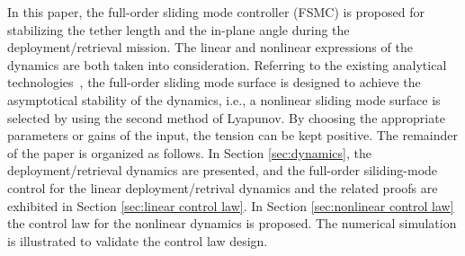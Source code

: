 \documentclass[conference]{IEEEtran}
\theoremstyle{plain}
\begin{document}
In this paper, the full-order sliding mode controller (FSMC) is proposed for stabilizing the tether length and the in-plane angle during the deployment/retrieval mission. The linear and nonlinear expressions of the dynamics are both taken into consideration. Referring to the existing analytical technologies~\cite{Vadali1991Feedback}, the full-order sliding mode surface is designed to achieve the asymptotical stability of the dynamics, i.e., a nonlinear sliding mode surface is selected by using the second method of Lyapunov. By choosing the appropriate parameters or gains of the input, the tension can be kept positive. The remainder of the paper is organized as follows. In Section \ref{sec:dynamics}, the deployment/retrieval dynamics are presented, and the full-order siliding-mode control for the linear deployment/retrival dynamics and the related proofs are exhibited in Section \ref{sec:linear control law}. In Section \ref{sec:nonlinear control law} the control law for the nonlinear dynamics is proposed. The numerical simulation is illustrated to validate the control law design.
\end{document}
